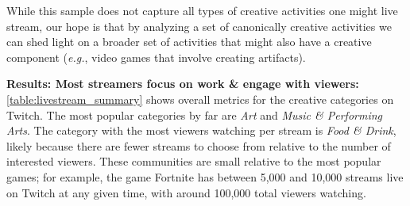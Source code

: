 While this sample does not capture all types of creative activities one might live stream, our hope is that by analyzing a set of canonically creative activities we can shed light on a broader set of activities that might also have a creative component (\textit{e.g.}, video games that involve creating artifacts).

\textbf{Results: Most streamers focus on work \& engage with viewers:}
\autoref{table:livestream_summary} shows overall metrics for the creative categories on Twitch. The most popular categories by far are \textit{Art} and \textit{Music \& Performing Arts}. The category with the most viewers watching per stream is \textit{Food \& Drink}, likely because there are fewer streams to choose from relative to the number of interested viewers. These communities are small relative to the most popular games; for example, the game Fortnite has between 5,000 and 10,000 streams live on Twitch at any given time, with around 100,000 total viewers watching. %

